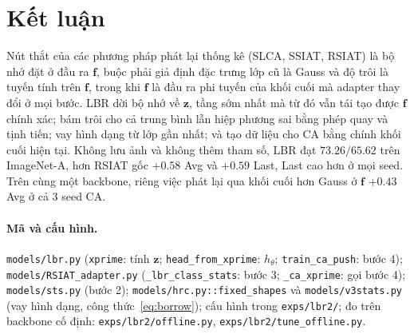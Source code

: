 \documentclass[11pt]{article}
\newcommand{\vf}{\mathbf{f}}
\newcommand{\vz}{\mathbf{z}}
\begin{document}
\section{Kết luận}
Nút thắt của các phương pháp phát lại thống kê (SLCA, SSIAT, RSIAT) là bộ nhớ đặt ở đầu ra $\vf$, buộc phải giả định đặc
trưng lớp cũ là Gauss và độ trôi là tuyến tính trên $\vf$, trong khi $\vf$ là đầu ra phi tuyến của khối cuối mà adapter
thay đổi ở mọi bước. LBR dời bộ nhớ về $\vz$, tầng sớm nhất mà từ đó vẫn tái tạo được $\vf$ chính xác; bám trôi cho cả
trung bình lẫn hiệp phương sai bằng phép quay và tịnh tiến; vay hình dạng từ lớp gần nhất; và tạo dữ liệu cho CA bằng
chính khối cuối hiện tại. Không lưu ảnh và không thêm tham số, LBR đạt $73.26/65.62$ trên ImageNet-A, hơn RSIAT gốc
$+0.58$ Avg và $+0.59$ Last, Last cao hơn ở mọi seed. Trên cùng một backbone, riêng việc phát lại qua khối cuối hơn
Gauss ở $\vf$ $+0.43$ Avg ở cả 3 seed CA.

\paragraph{Mã và cấu hình.} \texttt{models/lbr.py} (\texttt{xprime}: tính $\vz$; \texttt{head\_from\_xprime}: $h_\theta$;
\texttt{train\_ca\_push}: bước 4); \texttt{models/RSIAT\_adapter.py} (\texttt{\_lbr\_class\_stats}: bước 3;
\texttt{\_ca\_xprime}: gọi bước 4); \texttt{models/sts.py} (bước 2); \texttt{models/hrc.py::fixed\_shapes} và
\texttt{models/v3stats.py} (vay hình dạng, công thức~\eqref{eq:borrow}); cấu hình trong \texttt{exps/lbr2/}; đo trên
backbone cố định: \texttt{exps/lbr2/offline.py}, \texttt{exps/lbr2/tune\_offline.py}.
\end{document}
